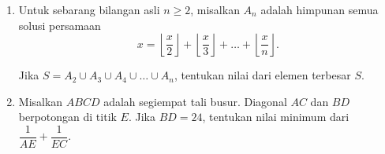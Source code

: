 \documentclass[12pt]{scrartcl}
\begin{document}
\begin{enumerate}[resume]
		\item Untuk sebarang bilangan asli $n \ge 2$, misalkan $A_n$ adalah himpunan semua solusi persamaan $$x=\left\lfloor \frac{x}{2}\right \rfloor+\left\lfloor \frac{x}{3}\right \rfloor+\dots+\left\lfloor\frac{x}{n} \right \rfloor.$$
		
		Jika $S = A_2 \cup A_3 \cup A_4 \cup \dots \cup A_n$, tentukan nilai dari elemen terbesar $S$.
		
		\item Misalkan $ABCD$ adalah segiempat tali busur. Diagonal $AC$ dan $BD$ berpotongan di titik $E$. Jika $BD=24$, tentukan nilai minimum dari $\dfrac{1}{AE}+\dfrac{1}{EC}$.
\end{enumerate}
	
	
\end{document}
